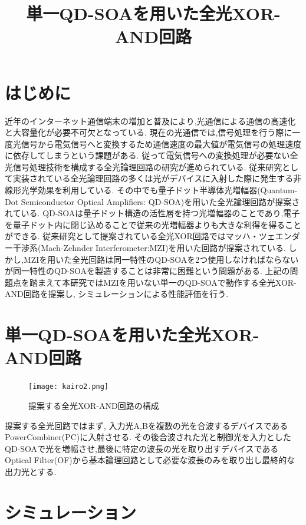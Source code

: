 \documentclass[dvipdfmx]{ujarticle}
\title{単一QD-SOAを用いた全光XOR-AND回路}
\author{}
\begin{document}
\maketitle

\section{はじめに}
近年のインターネット通信端末の増加と普及により,光通信による通信の高速化と大容量化が必要不可欠となっている.
現在の光通信では,信号処理を行う際に一度光信号から電気信号へと変換するため通信速度の最大値が電気信号の処理速度に依存してしまうという課題がある.
従って電気信号への変換処理が必要ない全光信号処理技術を構成する全光論理回路の研究が進められている.
従来研究として実装されている全光論理回路の多くは光がデバイスに入射した際に発生する非線形光学効果を利用している.
その中でも量子ドット半導体光増幅器(Quantum-Dot Semiconductor Optical Amplifiers: QD-SOA)を用いた全光論理回路が提案されている.
QD-SOAは量子ドット構造の活性層を持つ光増幅器のことであり,電子を量子ドット内に閉じ込めることで従来の光増幅器よりも大きな利得を得ることができる.
従来研究として提案されている全光XOR回路ではマッハ・ツェエンダー干渉系(Mach-Zehnder Interferometer:MZI)を用いた回路が提案されている.
しかし,MZIを用いた全光回路は同一特性のQD-SOAを2つ使用しなければならないが同一特性のQD-SOAを製造することは非常に困難という問題がある.
上記の問題点を踏まえて本研究ではMZIを用いない単一のQD-SOAで動作する全光XOR-AND回路を提案し, シミュレーションによる性能評価を行う.

\section{単一QD-SOAを用いた全光XOR-AND回路}

\begin{figure}[h]
  \begin{center}
    \texttt{[image: kairo2.png]}
    \caption{提案する全光XOR-AND回路の構成}
  \end{center}
\end{figure}
提案する全光回路ではまず, 入力光A,Bを複数の光を合波するデバイスであるPowerCombiner(PC)に入射させる.
その後合波された光と制御光を入力としたQD-SOAで光を増幅させ,最後に特定の波長の光を取り出すデバイスであるOptical Filter(OF)から基本論理回路として必要な波長のみを取り出し最終的な出力光とする.

\section{シミュレーション}
\end{document}

